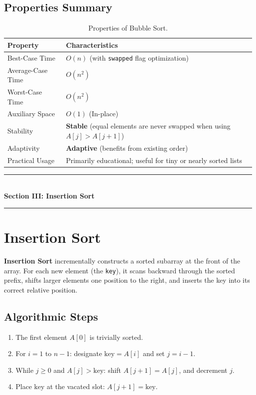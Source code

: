 \subsection{Properties Summary}

\begin{table}[htbp]
\centering
\small
\begin{tabularx}{\textwidth}{l X}
\toprule
\textbf{Property} & \textbf{Characteristics} \\
\midrule
Best-Case Time    & $O(n)$ (with \texttt{swapped} flag optimization) \\
Average-Case Time & $O(n^2)$ \\
Worst-Case Time   & $O(n^2)$ \\
Auxiliary Space   & $O(1)$ (In-place) \\
Stability         & \textbf{Stable} (equal elements are never swapped when using $A[j] > A[j+1]$) \\
Adaptivity        & \textbf{Adaptive} (benefits from existing order) \\
Practical Usage   & Primarily educational; useful for tiny or nearly sorted lists \\
\bottomrule
\end{tabularx}
\caption{Properties of Bubble Sort.}
\end{table}

\newpage
\begin{center}
\vspace{0.5em}
{\color{primary}\rule{0.45\textwidth}{1.2pt}}\\[4pt]
{\Large\bfseries\color{primary} Section III: Insertion Sort}\\[2pt]
{\color{primary}\rule{0.45\textwidth}{1.2pt}}
\vspace{0.5em}
\end{center}

\section{Insertion Sort}

\textbf{Insertion Sort} incrementally constructs a sorted subarray at the front of the array. For each new element (the \texttt{key}), it scans backward through the sorted prefix, shifts larger elements one position to the right, and inserts the key into its correct relative position.

\subsection{Algorithmic Steps}
\begin{enumerate}
    \item The first element $A[0]$ is trivially sorted.
    \item For $i = 1$ to $n-1$: designate $\text{key} = A[i]$ and set $j = i - 1$.
    \item While $j \geq 0$ and $A[j] > \text{key}$: shift $A[j+1] = A[j]$, and decrement $j$.
    \item Place $\text{key}$ at the vacated slot: $A[j+1] = \text{key}$.
\end{enumerate}

